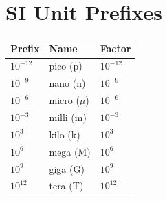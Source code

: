 \section{SI Unit Prefixes}
\begin{center}
\begin{tabular}{lll}
\toprule
\textbf{Prefix} & \textbf{Name} & \textbf{Factor} \\
\midrule
      $10^{-12}$ & pico (p)   & $10^{-12}$ \\
      $10^{-9}$ & nano (n)  & $10^{-9}$ \\
      $10^{-6}$ & micro ($\mu$) & $10^{-6}$ \\
      $10^{-3}$ & milli (m)  & $10^{-3}$ \\
      $10^{3}$  & kilo (k)   & $10^{3}$ \\
      $10^{6}$  & mega (M)   & $10^{6}$ \\
      $10^{9}$  & giga (G)   & $10^{9}$ \\
      $10^{12}$ & tera (T)   & $10^{12}$ \\
\bottomrule
\end{tabular}
\end{center}


\clearpage
